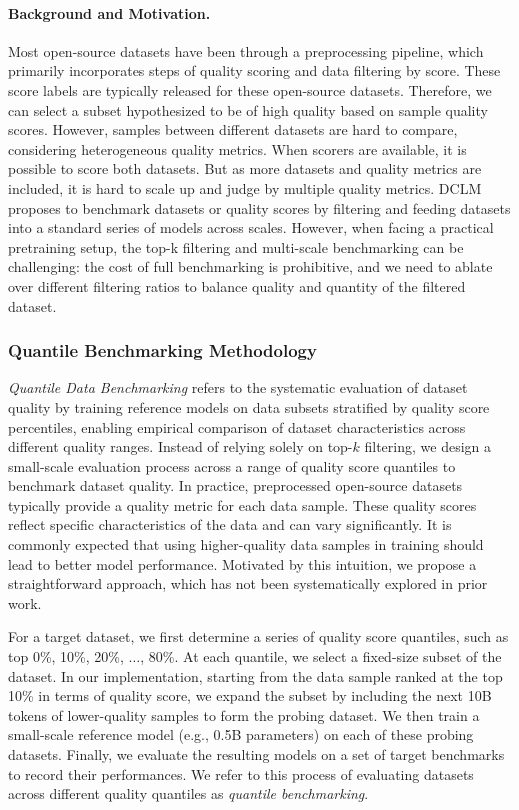 \paragraph{Background and Motivation.} Most open-source datasets have been through a preprocessing pipeline, which primarily incorporates steps of quality scoring and data filtering by score. These score labels are typically released for these open-source datasets. Therefore, we can select a subset hypothesized to be of high quality based on sample quality scores. However, samples between different datasets are hard to compare, considering heterogeneous quality metrics. When scorers are available, it is possible to score both datasets. But as more datasets and quality metrics are included, it is hard to scale up and judge by multiple quality metrics. DCLM~\cite{DCLM} proposes to benchmark datasets or quality scores by filtering and feeding datasets into a standard series of models across scales. However, when facing a practical pretraining setup, the top-k filtering and multi-scale benchmarking can be challenging: the cost of full benchmarking is prohibitive, and we need to ablate over different filtering ratios to balance quality and quantity of the filtered dataset. 

\subsubsection{Quantile Benchmarking Methodology}

\textit{Quantile Data Benchmarking} refers to the systematic evaluation of dataset quality by training reference models on data subsets stratified by quality score percentiles, enabling empirical comparison of dataset characteristics across different quality ranges. Instead of relying solely on top-$k$ filtering, we design a small-scale evaluation process across a range of quality score quantiles to benchmark dataset quality. In practice, preprocessed open-source datasets typically provide a quality metric for each data sample. These quality scores reflect specific characteristics of the data and can vary significantly. It is commonly expected that using higher-quality data samples in training should lead to better model performance. Motivated by this intuition, we propose a straightforward approach, which has not been systematically explored in prior work.

For a target dataset, we first determine a series of quality score quantiles, such as top 0\%, 10\%, 20\%, $\dots$, 80\%. At each quantile, we select a fixed-size subset of the dataset. In our implementation, starting from the data sample ranked at the top 10\% in terms of quality score, we expand the subset by including the next 10B tokens of lower-quality samples to form the probing dataset. We then train a small-scale reference model (e.g., 0.5B parameters) on each of these probing datasets. Finally, we evaluate the resulting models on a set of target benchmarks to record their performances. We refer to this process of evaluating datasets across different quality quantiles as \textit{quantile benchmarking}.

